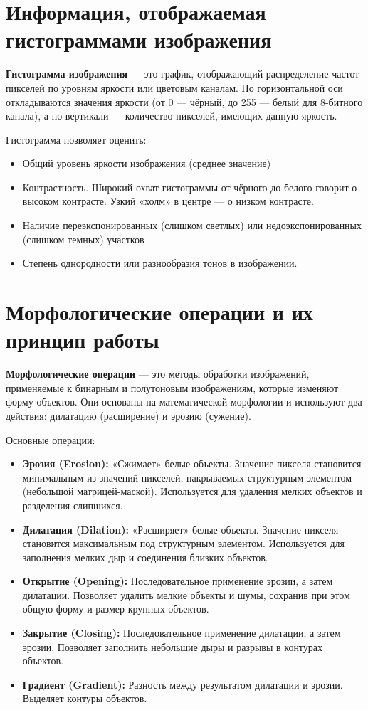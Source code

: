\documentclass[12pt,a4paper]{article}
\begin{document}
\section{Информация, отображаемая гистограммами изображения}

\textbf{Гистограмма изображения} --- это график, отображающий распределение частот пикселей по уровням яркости или цветовым каналам. По горизонтальной оси откладываются значения яркости (от 0 --- чёрный, до 255 --- белый для 8-битного канала), а по вертикали --- количество пикселей, имеющих данную яркость.

Гистограмма позволяет оценить:
\begin{itemize}
    \item Общий уровень яркости изображения (среднее значение)
    \item Контрастность. Широкий охват гистограммы от чёрного до белого говорит о высоком контрасте. Узкий «холм» в центре --- о низком контрасте.
    \item Наличие переэкспонированных (слишком светлых) или недоэкспонированных (слишком темных) участков
    \item Степень однородности или разнообразия тонов в изображении.
\end{itemize}

\section{Морфологические операции и их принцип работы}

\textbf{Морфологические операции} --- это методы обработки изображений, применяемые к бинарным и полутоновым изображениям, которые изменяют форму объектов. Они основаны на математической морфологии и используют два действия: дилатацию (расширение) и эрозию (сужение).

Основные операции:
\begin{itemize}
    \item \textbf{Эрозия (Erosion):} «Сжимает» белые объекты. Значение пикселя становится минимальным из значений пикселей, накрываемых структурным элементом (небольшой матрицей-маской). Используется для удаления мелких объектов и разделения слипшихся.
    \item \textbf{Дилатация (Dilation):} «Расширяет» белые объекты. Значение пикселя становится максимальным под структурным элементом. Используется для заполнения мелких дыр и соединения близких объектов.
    \item \textbf{Открытие (Opening):} Последовательное применение эрозии, а затем дилатации. Позволяет удалить мелкие объекты и шумы, сохранив при этом общую форму и размер крупных объектов.
    \item \textbf{Закрытие (Closing):} Последовательное применение дилатации, а затем эрозии. Позволяет заполнить небольшие дыры и разрывы в контурах объектов.
    \item \textbf{Градиент (Gradient):} Разность между результатом дилатации и эрозии. Выделяет контуры объектов.
\end{itemize}
\end{document}
